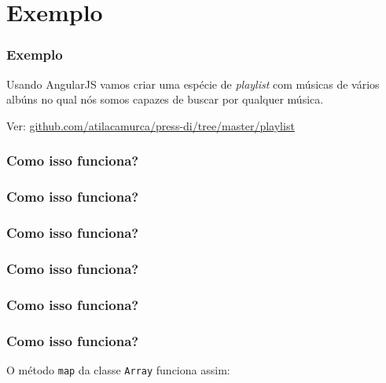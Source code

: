 \section{Exemplo}

\begin{frame}\frametitle{Exemplo}

Usando AngularJS vamos criar uma espécie de \emph{playlist} com músicas
de vários albúns no qual nós somos capazes de buscar por qualquer
música.

Ver:
\href{https://github.com/atilacamurca/press-di/tree/master/playlist}{github.com/atilacamurca/press-di/tree/master/playlist}

\end{frame}

\begin{frame}\frametitle{Como isso funciona?}


\end{frame}

\begin{frame}\frametitle{Como isso funciona?}


\end{frame}

\begin{frame}\frametitle{Como isso funciona?}


\end{frame}

\begin{frame}\frametitle{Como isso funciona?}


\end{frame}

\begin{frame}\frametitle{Como isso funciona?}


\end{frame}

\begin{frame}[fragile]\frametitle{Como isso funciona?}

O método \texttt{map} da classe \texttt{Array} funciona assim:


\end{frame}

